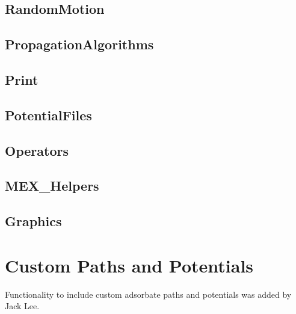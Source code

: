 \documentclass[11pt,letterpaper]{article}
\renewcommand{\\}{\bigskip}
\begin{document}
\subsection{RandomMotion}

\subsection{PropagationAlgorithms}

\subsection{Print}

\subsection{PotentialFiles}

\subsection{Operators}

\subsection{MEX\_Helpers}

\subsection{Graphics}

\label{sec:custompaths}
\section{Custom Paths and Potentials}
Functionality to include custom adsorbate paths and potentials was added by Jack Lee.
\end{document}
